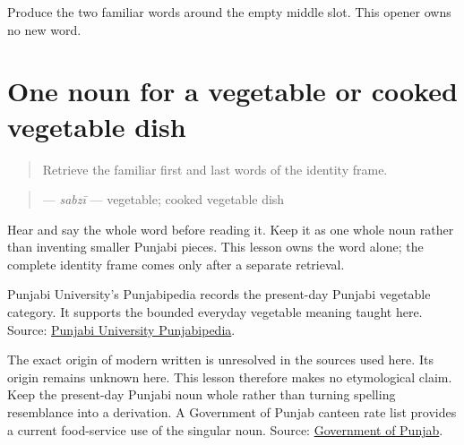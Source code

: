 \begin{tcolorbox}[breakable,colback=teal!4,colframe=teal!35!black,title={Before you move on}]
Produce the two familiar words around the empty middle slot. This opener owns no new word.
\end{tcolorbox}
\section[\texorpdfstring{\pa{ਸਬਜ਼ੀ} (sabzi)}{ਸਬਜ਼ੀ (sabzi)}]{One noun for a vegetable or cooked vegetable dish}

\label{lesson:PA-C200-sabzi}



\begin{quote}
Retrieve the familiar first and last words of the identity frame.
\end{quote}

\begin{grammarlens}[title={Grammar Lens: direct owner}]
\begin{quote}
\textbf{} — \emph{sabzī} — vegetable; cooked vegetable dish
\end{quote}

Hear and say the whole word before reading it. Keep it as one whole noun rather than inventing smaller Punjabi pieces. This lesson owns the word alone; the complete identity frame comes only after a separate retrieval.
\end{grammarlens}

\begin{cousinweb}
Punjabi University's Punjabipedia records the present-day Punjabi vegetable category. It supports the bounded everyday vegetable meaning taught here. Source: \href{https://punjabipedia.org/topic.aspx?txt=\%E0\%A8\%B8\%E0\%A8\%AC\%E0\%A9\%9B\%E0\%A9\%80\%E0\%A8\%86\%E0\%A8\%82}{Punjabi University Punjabipedia}.

The exact origin of modern written \textbf{} is unresolved in the sources used here. Its origin remains unknown here. This lesson therefore makes no etymological claim. Keep the present-day Punjabi noun whole rather than turning spelling resemblance into a derivation. A Government of Punjab canteen rate list provides a current food-service use of the singular noun. Source: \href{https://punjab.gov.in/wp-content/uploads/2022/04/Hospitality-Food-and-Beverages-Rate-List-M.L.A-Hostel-Canteen-Punjab-Chd.pdf}{Government of Punjab}.
\end{cousinweb}

